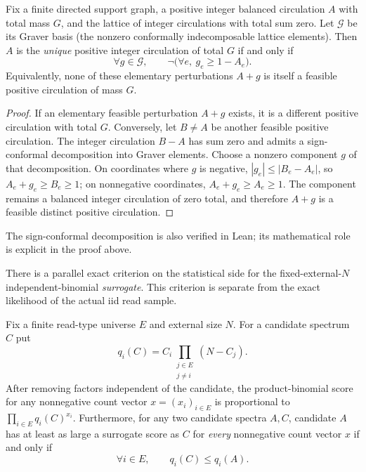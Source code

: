 \begin{theorem}
\label{thm:graver-rigidity}
Fix a finite directed support graph, a positive integer balanced
circulation $A$ with total mass $G$, and the lattice of integer
circulations with total sum zero. Let $\mathcal G$ be its Graver basis
(the nonzero conformally indecomposable lattice elements).
Then $A$ is the \emph{unique} positive integer circulation of total
$G$ if and only if
\[
  \forall g\in\mathcal G,\qquad
  \neg\bigl(\forall e,\ g_e\ge 1-A_e\bigr).
\]
Equivalently, none of these elementary perturbations $A+g$
is itself a feasible positive circulation of mass $G$.
\end{theorem}
\begin{proof}
If an elementary feasible perturbation $A+g$ exists, it
is a different positive circulation with total $G$.
Conversely, let $B\ne A$ be another feasible positive
circulation. The integer circulation $B-A$ has sum zero
and admits a sign-conformal decomposition into Graver
elements. Choose a nonzero component $g$ of that
decomposition. On coordinates where $g$ is negative,
$|g_e|\le |B_e-A_e|$, so
$A_e+g_e\ge B_e\ge1$; on nonnegative coordinates,
$A_e+g_e\ge A_e\ge1$. The component remains a
balanced integer circulation of zero total, and therefore
$A+g$ is a feasible distinct positive circulation.
\end{proof}

The sign-conformal decomposition is also verified in Lean;
its mathematical role is explicit in the proof above.


There is a parallel exact criterion on the statistical side for the
fixed-external-$N$ independent-binomial \emph{surrogate}. This criterion
is separate from the exact likelihood of the actual iid read sample.

\begin{theorem}
\label{thm:binomial-weights}
Fix a finite read-type universe $E$ and external size $N$. For a
candidate spectrum $C$ put
\[
 q_i(C)=C_i\prod_{\substack{j\in E\\j\ne i}}(N-C_j).
\]
After removing factors independent of the candidate, the
product-binomial score for any nonnegative count vector
$x=(x_i)_{i\in E}$ is proportional to
$\prod_{i\in E}q_i(C)^{x_i}$. Furthermore, for any two candidate
spectra $A,C$, candidate $A$ has at least as large a surrogate
score as $C$ for \emph{every} nonnegative count vector $x$ if and
only if
\[
  \forall i\in E,\qquad q_i(C)\le q_i(A).
\]
\end{theorem}

